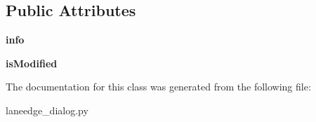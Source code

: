 \subsection*{Public Attributes}
\begin{DoxyCompactItemize}
\item 
\hypertarget{class_sim_g_d_c_1_1laneedge__dialog_1_1_lane_edge_dialog_afca596b47d84bf9a1d7f65e2bd5b81e5}{}{\bfseries info}\label{class_sim_g_d_c_1_1laneedge__dialog_1_1_lane_edge_dialog_afca596b47d84bf9a1d7f65e2bd5b81e5}

\item 
\hypertarget{class_sim_g_d_c_1_1laneedge__dialog_1_1_lane_edge_dialog_a2f521fbd28ef7e45cefa2e46f15e55d1}{}{\bfseries is\+Modified}\label{class_sim_g_d_c_1_1laneedge__dialog_1_1_lane_edge_dialog_a2f521fbd28ef7e45cefa2e46f15e55d1}

\end{DoxyCompactItemize}


The documentation for this class was generated from the following file\+:\begin{DoxyCompactItemize}
\item 
laneedge\+\_\+dialog.\+py\end{DoxyCompactItemize}
